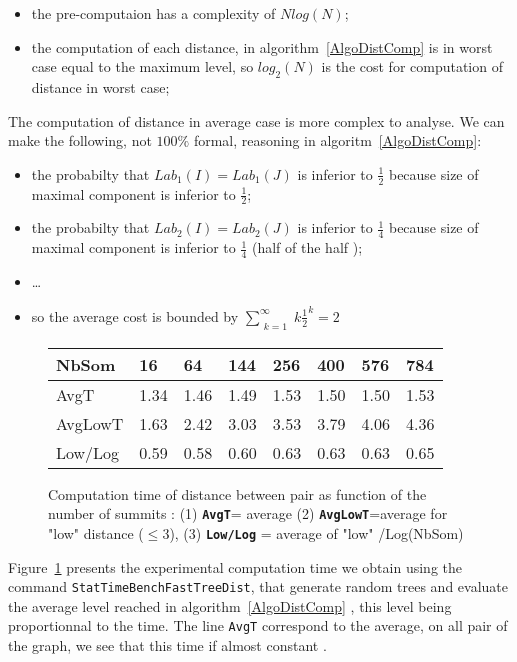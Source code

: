 \documentclass[a4paper]{article}
\begin{document}
\begin{itemize}
   \item  the pre-computaion has a complexity of $N log(N)$;
   \item  the computation of each distance, in algorithm~\ref{AlgoDistComp} is in worst case equal to 
          the maximum level, so $log_2(N)$ is the cost for computation of distance in worst case;
\end{itemize} 

The computation of distance in average case is more complex to analyse. We
can make the following, not $100\%$ formal, reasoning in algoritm~\ref{AlgoDistComp}:

\begin{itemize}
   \item  the probabilty that  $Lab_1(I)=Lab_1(J)$ is inferior  to $\frac{1}{2}$ because size
          of maximal component is inferior to $\frac{1}{2}$;
   \item  the probabilty that  $Lab_2(I)=Lab_2(J)$ is inferior  to $\frac{1}{4}$ because size
          of maximal component is inferior to $\frac{1}{4}$  (half of the half );
   \item  \dots 
   \item  so the average cost is bounded by $\sum\limits_{\substack{k=1}}^{\infty} k \frac{1}{2}^k = 2$
\end{itemize}


\begin{figure}
\centering
\begin{tabular}{| l || l |l | l | l | l | l | l |}
   \hline
   NbSom        & 16     & 64     & 144    &    256 &   400 &   576     & 784   \\ \hline \hline
   AvgT         & 1.34   & 1.46   & 1.49   &   1.53 &  1.50 &   1.50   & 1.53   \\ \hline
   AvgLowT      & 1.63   & 2.42   & 3.03   &   3.53 &  3.79 &   4.06   & 4.36   \\ \hline
   Low/Log  & 0.59   & 0.58   &  0.60  &    0.63 & 0.63 &   0.63   &  0.65      \\ \hline 
\end{tabular}
\caption{Computation time of distance between pair as function of the number of summits : (1) {\tt \bf AvgT}= average 
(2) {\tt \bf  AvgLowT}=average for "low" distance ($\leq 3$), (3) {\tt \bf Low/Log} =  average of "low" /Log(NbSom)}
\label{ExpCalc}
\end{figure}


Figure~\ref{ExpCalc} presents the experimental computation time we obtain using the 
command {\tt StatTimeBenchFastTreeDist}, that generate random trees and evaluate
the average level reached in algorithm~\ref{AlgoDistComp} , this level being proportionnal to the time.
The line {\tt AvgT}  correspond to the average, on all pair of the graph, 
we see that this time if almost constant .
\end{document}
